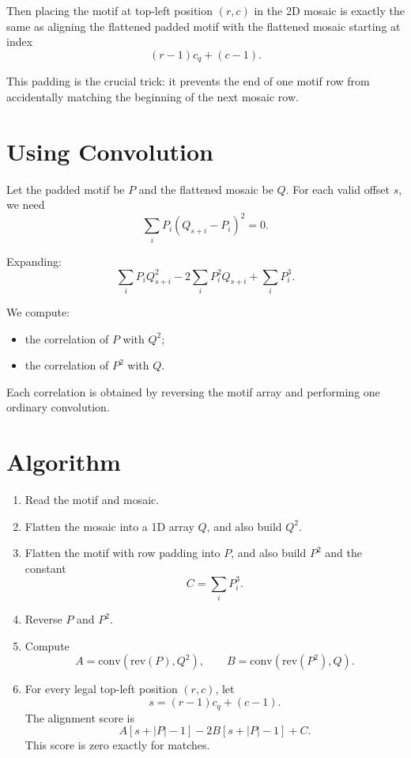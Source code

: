\documentclass[11pt]{article}
\begin{document}
Then placing the motif at top-left position $(r,c)$ in the 2D mosaic is exactly the same as aligning the
flattened padded motif with the flattened mosaic starting at index
\[
    (r-1)c_q + (c-1).
\]

This padding is the crucial trick: it prevents the end of one motif row from accidentally matching the
beginning of the next mosaic row.

\section*{Using Convolution}

Let the padded motif be $P$ and the flattened mosaic be $Q$. For each valid offset $s$, we need
\[
    \sum_i P_i (Q_{s+i} - P_i)^2 = 0.
\]

Expanding:
\[
    \sum_i P_i Q_{s+i}^2
    - 2 \sum_i P_i^2 Q_{s+i}
    + \sum_i P_i^3.
\]

We compute:
\begin{itemize}[leftmargin=*]
    \item the correlation of $P$ with $Q^2$;
    \item the correlation of $P^2$ with $Q$.
\end{itemize}

Each correlation is obtained by reversing the motif array and performing one ordinary convolution.

\section*{Algorithm}

\begin{enumerate}[leftmargin=*]
    \item Read the motif and mosaic.
    \item Flatten the mosaic into a 1D array $Q$, and also build $Q^2$.
    \item Flatten the motif with row padding into $P$, and also build $P^2$ and the constant
    \[
        C = \sum_i P_i^3.
    \]
    \item Reverse $P$ and $P^2$.
    \item Compute
    \[
        A = \text{conv}(\text{rev}(P), Q^2),
        \qquad
        B = \text{conv}(\text{rev}(P^2), Q).
    \]
    \item For every legal top-left position $(r,c)$, let
    \[
        s = (r-1)c_q + (c-1).
    \]
    The alignment score is
    \[
        A[s + |P| - 1] - 2B[s + |P| - 1] + C.
    \]
    This score is zero exactly for matches.
\end{enumerate}
\end{document}
